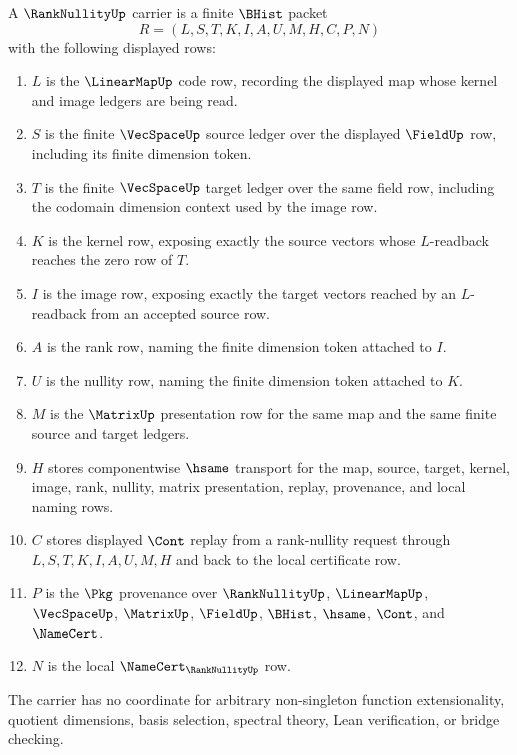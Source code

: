 \begin{definition}
\label{def:rank-nullity-carrier}
A $\RankNullityUp$ carrier is a finite $\BHist$ packet
$$
R=(L,S,T,K,I,A,U,M,H,C,P,N)
$$
with the following displayed rows:
\begin{enumerate}
\item $L$ is the $\LinearMapUp$ code row, recording the displayed map whose kernel and image ledgers are being read.
\item $S$ is the finite $\VecSpaceUp$ source ledger over the displayed $\FieldUp$ row, including its finite dimension token.
\item $T$ is the finite $\VecSpaceUp$ target ledger over the same field row, including the codomain dimension context used by the image row.
\item $K$ is the kernel row, exposing exactly the source vectors whose $L$-readback reaches the zero row of $T$.
\item $I$ is the image row, exposing exactly the target vectors reached by an $L$-readback from an accepted source row.
\item $A$ is the rank row, naming the finite dimension token attached to $I$.
\item $U$ is the nullity row, naming the finite dimension token attached to $K$.
\item $M$ is the $\MatrixUp$ presentation row for the same map and the same finite source and target ledgers.
\item $H$ stores componentwise $\hsame$ transport for the map, source, target, kernel, image, rank, nullity, matrix presentation, replay, provenance, and local naming rows.
\item $C$ stores displayed $\Cont$ replay from a rank-nullity request through $L,S,T,K,I,A,U,M,H$ and back to the local certificate row.
\item $P$ is the $\Pkg$ provenance over $\RankNullityUp$, $\LinearMapUp$, $\VecSpaceUp$, $\MatrixUp$, $\FieldUp$, $\BHist$, $\hsame$, $\Cont$, and $\NameCert$.
\item $N$ is the local $\NameCert_{\RankNullityUp}$ row.
\end{enumerate}
The carrier has no coordinate for arbitrary non-singleton function extensionality, quotient dimensions, basis selection, spectral theory, Lean verification, or bridge checking.
\end{definition}

